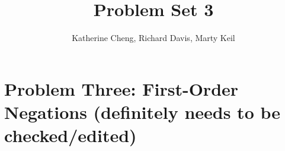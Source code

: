 \documentclass[10pt,letter]{article}
\begin{document}

\title{Problem Set 3}

\author{Katherine Cheng, Richard Davis, Marty Keil}

 
\maketitle 


\section*{Problem Three: First-Order Negations (definitely needs to be checked/edited)}
\end{document}
